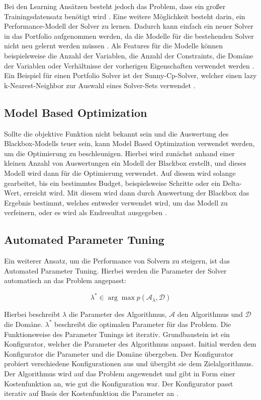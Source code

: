 Bei den Learning Ansätzen besteht jedoch das Problem, dass ein großer
Trainingsdatensatz benötigt wird \cite[15-16]{kotth12jo}. Eine weitere
Möglichkeit besteht darin, ein Performance-Modell der Solver zu lernen. Dadurch
kann einfach ein neuer Solver in das Portfolio aufgenommen werden, da die
Modelle für die bestehenden Solver nicht neu gelernt werden müssen
\cite[18]{kotth12jo}. Als Features für die Modelle können beispielsweise die
Anzahl der Variablen, die Anzahl der Constraints, die Domäne der Variablen oder
Verhältnisse der vorherigen Eigenschaften verwendet werden \cite[22]{kotth12jo}.
Ein Beispiel für einen Portfolio Solver ist der Sunny-Cp-Solver, welcher einen
lazy k-Nearest-Neighbor zur Auswahl eines Solver-Sets verwendet
\cite[4]{amadi15jo}.


\subsection{Model Based Optimization}
\label{sec:Model-Based-Optimization}

Sollte die objektive Funktion nicht bekannt sein und die Auswertung des
Blackbox-Modells teuer sein, kann Model Based Optimization verwendet werden, um
die Optimierung zu beschleunigen. Hierbei wird zunächst anhand einer kleinen
Anzahl von Auswertungen ein Modell der Blackbox erstellt, und dieses Modell wird
dann für die Optimierung verwendet. Auf diesem wird solange gearbeitet, bis ein
bestimmtes Budget, beispielsweise Schritte oder ein Delta-Wert, erreicht wird.
Mit diesem wird dann durch Auswertung der Blackbox das Ergebnis bestimmt,
welches entweder verwendet wird, um das Modell zu verfeinern, oder es wird als
Endresultat ausgegeben \cite[4]{bisch18pr}.


\subsection{Automated Parameter Tuning}
\label{sec:Automated-Parameter-Tuning}

Ein weiterer Ansatz, um die Performance von Solvern zu steigern, ist das
Automated Parameter Tuning. Hierbei werden die Parameter der Solver automatisch
an das Problem angepasst:

\[
\lambda^{*} \in \arg\max p(\mathcal{A}_{\lambda}, \mathcal{D})
\]

Hierbei beschreibt \(\lambda\) die Parameter des Algorithmus, \(\mathcal{A}\)
den Algorithmus und \(\mathcal{D}\) die Domäne. \(\lambda^{*}\) beschreibt die
optimalen Parameter für das Problem. Die Funktionsweise des Parameter Tunings
ist iterativ. Grundbaustein ist ein Konfigurator, welcher die Parameter des
Algorithmus anpasst. Initial werden dem Konfigurator die Parameter und die
Domäne übergeben. Der Konfigurator probiert verschiedene Konfigurationen aus und
übergibt sie dem Zielalgorithmus. Der Algorithmus wird auf das Problem
angewendet und gibt in Form einer Kostenfunktion an, wie gut die Konfiguration
war. Der Konfigurator passt iterativ auf Basis der Kostenfunktion die Parameter
an \cite[31-38]{kotth23pr}.

